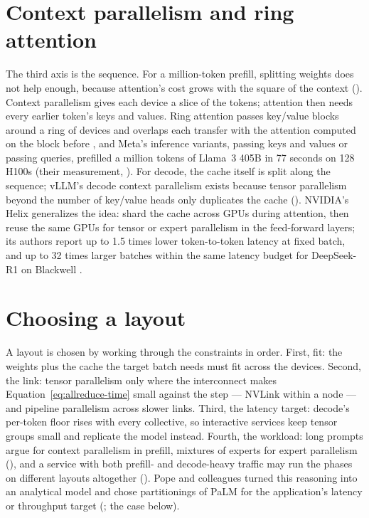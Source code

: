 \section{Context parallelism and ring attention}

The third axis is the sequence. For a million-token prefill, splitting weights
does not help enough, because attention's cost grows with the square of the
context (). Context parallelism gives each device a slice of
the tokens; attention then needs every earlier token's keys and values. Ring
attention passes key/value blocks around a ring of devices and overlaps each
transfer with the attention computed on the block before
\cite{liu2023ringattention}, and Meta's inference variants, passing keys and
values or passing queries, prefilled a million tokens of Llama~3 405B in 77
seconds on 128 H100s (their measurement, \cite{yang2024contextparallel}). For
decode, the cache itself is split along the sequence; vLLM's decode context
parallelism exists because tensor parallelism beyond the number of key/value
heads only duplicates the cache (). NVIDIA's Helix
generalizes the idea: shard the cache across GPUs during attention, then reuse
the same GPUs for tensor or expert parallelism in the feed-forward layers; its
authors report up to 1.5 times lower token-to-token latency at fixed batch, and
up to 32 times larger batches within the same latency budget for DeepSeek-R1
on Blackwell \cite{bhatia2025helix}.

\section{Choosing a layout}

A layout is chosen by working through the constraints in order. First, fit: the
weights plus the cache the target batch needs must fit across the devices.
Second, the link: tensor parallelism only where the interconnect makes
Equation~\eqref{eq:allreduce-time} small against the step --- NVLink within a
node --- and pipeline parallelism across slower links. Third, the latency
target: decode's per-token floor rises with every collective, so interactive
services keep tensor groups small and replicate the model instead. Fourth, the
workload: long prompts argue for context parallelism in prefill, mixtures of
experts for expert parallelism (), and a service with
both prefill- and decode-heavy traffic may run the phases on different layouts
altogether (). Pope and colleagues turned this
reasoning into an analytical model and chose partitionings of PaLM for the
application's latency or throughput target (\cite{pope2022scaling}; the case below).

